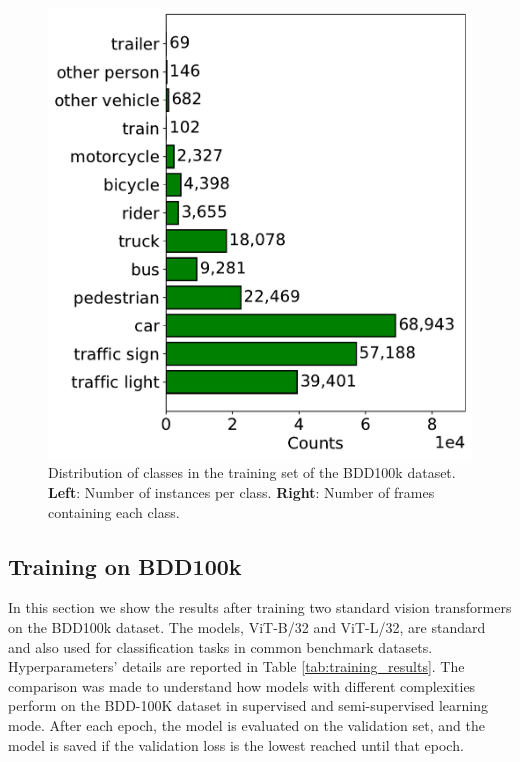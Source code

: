 \begin{figure}
\begin{minipage}{0.49\textwidth}
        \includegraphics[width=\textwidth]{images/bdd100k/frame_counts.pdf}
    \end{minipage}
    \caption[Distribution of classes in the training set of the BDD100k dataset.]
    {Distribution of classes in the training set of the BDD100k dataset.
    \textbf{Left}: Number of instances per class. 
    \textbf{Right}: Number of frames containing each class.
    }
    \label{fig:bdd100k_distribution}
\end{figure}

\subsection{Training on BDD100k}
In this section we show the results after training two standard vision transformers 
on the BDD100k dataset. The models, ViT-B/32 and ViT-L/32, are standard and 
also used for classification tasks in common benchmark datasets.
Hyperparameters' details are reported in Table \ref{tab:training_results}.
The comparison was made to understand how models with different complexities 
perform on the BDD-100K dataset in supervised and semi-supervised learning mode.
After each epoch, the model is evaluated on the validation set, and the model 
is saved if the validation loss is the lowest reached until that epoch.

